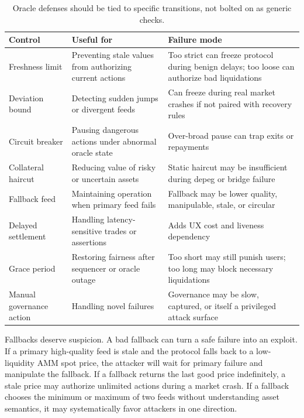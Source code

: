\begin{table}[htbp]
\centering
\small
\renewcommand{\arraystretch}{1.16}
\begin{tabularx}{\textwidth}{@{}>{\RaggedRight\arraybackslash}p{}>{\RaggedRight\arraybackslash}p{}X@{}}
\toprule
Control & Useful for & Failure mode \\
\midrule
Freshness limit & Preventing stale values from authorizing current actions & Too strict can freeze protocol during benign delays; too loose can authorize bad liquidations \\
Deviation bound & Detecting sudden jumps or divergent feeds & Can freeze during real market crashes if not paired with recovery rules \\
Circuit breaker & Pausing dangerous actions under abnormal oracle state & Over-broad pause can trap exits or repayments \\
Collateral haircut & Reducing value of risky or uncertain assets & Static haircut may be insufficient during depeg or bridge failure \\
Fallback feed & Maintaining operation when primary feed fails & Fallback may be lower quality, manipulable, stale, or circular \\
Delayed settlement & Handling latency-sensitive trades or assertions & Adds UX cost and liveness dependency \\
Grace period & Restoring fairness after sequencer or oracle outage & Too short may still punish users; too long may block necessary liquidations \\
Manual governance action & Handling novel failures & Governance may be slow, captured, or itself a privileged attack surface \\
\bottomrule
\end{tabularx}
\caption{Oracle defenses should be tied to specific transitions, not bolted on as generic checks.}
\end{table}

Fallbacks deserve suspicion. A bad fallback can turn a safe failure into an exploit. If a primary high-quality feed is stale and the protocol falls back to a low-liquidity AMM spot price, the attacker will wait for primary failure and manipulate the fallback. If a fallback returns the last good price indefinitely, a stale price may authorize unlimited actions during a market crash. If a fallback chooses the minimum or maximum of two feeds without understanding asset semantics, it may systematically favor attackers in one direction.

